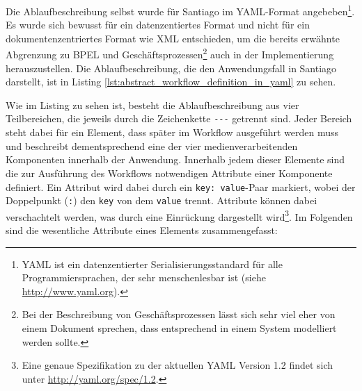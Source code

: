   Die Ablaufbeschreibung selbst wurde für Santiago im YAML-Format angebeben\footnote{YAML ist ein datenzentierter Serialisierungsstandard für alle Programmiersprachen, der sehr menschenlesbar ist (siehe \url{http://www.yaml.org}).}. Es wurde sich bewusst für ein datenzentiertes Format und nicht für ein dokumentenzentriertes Format wie XML entschieden, um die bereits erwähnte Abgrenzung zu BPEL und Geschäftsprozessen\footnote{Bei der Beschreibung von Geschäftsprozessen lässt sich sehr viel eher von einem Dokument sprechen, dass entsprechend in einem System modelliert werden sollte.} auch in der Implementierung herauszustellen. Die Ablaufbeschreibung, die den Anwendungsfall in Santiago darstellt, ist in Listing \ref{lst:abstract_workflow_definition_in_yaml} zu sehen.



  Wie im Listing zu sehen ist, besteht die Ablaufbeschreibung aus vier Teilbereichen, die jeweils durch die Zeichenkette \verb!---! getrennt sind. Jeder Bereich steht dabei für ein Element, dass später im Workflow ausgeführt werden muss und beschreibt dementsprechend eine der vier medienverarbeitenden Komponenten innerhalb der Anwendung. Innerhalb jedem dieser Elemente sind die zur Ausführung des Workflows notwendigen Attribute einer Komponente definiert. Ein Attribut wird dabei durch ein \verb!key: value!-Paar markiert, wobei der Doppelpunkt (\verb!:!) den \verb!key! von dem \verb!value! trennt. Attribute können dabei verschachtelt werden, was durch eine Einrückung dargestellt wird\footnote{Eine genaue Spezifikation zu der aktuellen YAML Version 1.2 findet sich unter \url{http://yaml.org/spec/1.2}.}. Im Folgenden sind die wesentliche Attribute eines Elements zusammengefasst:
  
